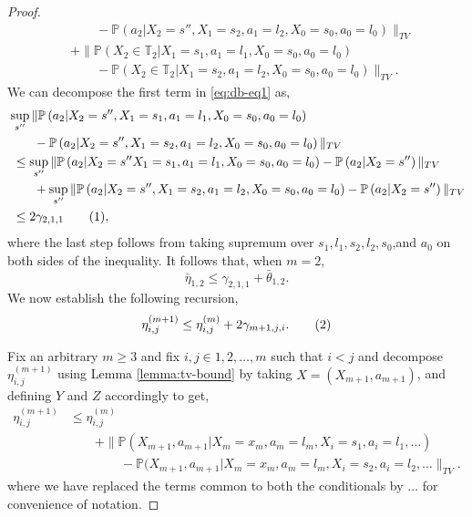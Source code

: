 \documentclass[10pt,a4paper]{amsart}
\newcommand{\Pbb}{\mathbb{P}}
\newcommand{\Tbb}{\mathbb{T}}
\newcommand{\lp}{\left(}
\newcommand\numberthis{\addtocounter{equation}{1}\tag{\theequation}}
\newcommand{\pow}[1]{^{(#1)}}
\newcommand{\prob}{\Pbb}
\newcommand{\probl}{\prob}
\newcommand{\rp}{\right)}
\begin{document}
\begin{proof}
\begin{align*}
    & \qquad -\probl\lp a_2|X_2=s'', X_1=s_2,a_1=l_2,X_0=s_0,a_0=l_0\rp\|_{TV}\\
    & + \|\probl\lp X_2\in \Tbb_2| X_1=s_1,a_1=l_1,X_0=s_0,a_0=l_0\rp\\
    & \qquad -\probl\lp X_2\in \Tbb_2| X_1=s_2,a_1=l_2,X_0=s_0,a_0=l_0\rp\|_{TV}.
\end{align*}
We can decompose the first term in \cref{eq:db-eq1} as,
\begin{align*}
    &\sup_{s''}\| \probl\lp a_2|X_2=s'', X_1=s_1,a_1=l_1,X_0=s_0,a_0=l_0\rp\\
    & \qquad -\probl\lp a_2|X_2=s'', X_1=s_2,a_1=l_2,X_0=s_0,a_0=l_0\rp\|_{TV}\\
    & \ \leq   \sup_{s''}\| \probl\lp a_2|X_2=s'' X_1=s_1,a_1=l_1,X_0=s_0,a_0=l_0\rp- \probl\lp a_2|X_2=s''\rp\|_{TV}\\
    & \qquad + \sup_{s''}\|\probl\lp a_2|X_2=s'', X_1=s_2,a_1=l_2,X_0=s_0,a_0=l_0\rp-\probl\lp a_2|X_2=s''\rp\|_{TV}\\
    & \ \leq 2\gamma_{2,1,1}\numberthis\label{eq:db-eq3},
\end{align*}
where the last step follows from taking supremum over $s_1,l_1,s_2,l_2,s_0$,and $a_0$ on both sides of the inequality. 
It follows that, when $m=2$,
\[
 \bar\eta_{1,2}\leq \gamma_{2,1,1}+\bar\theta_{1,2}.
\]
We now establish the following recursion,
\begin{align*}
 \eta_{i,j}^{(m+1)} \leq \eta_{i,j}^{(m)}+2\gamma_{m+1,j,i}.\numberthis\label{eq:db-eq5}    
\end{align*}

Fix an arbitrary $m\geq 3$ and fix $i,j\in{1,2,\dots,m}$ such that $i<j$ and
decompose $\eta_{i,j}\pow{m+1}$ using Lemma \ref{lemma:tv-bound} by taking $X=(X_{m+1},a_{m+1})$, and defining $Y$ and $Z$ accordingly to get,
\begin{align*}
    \eta_{i,j}^{(m+1)}& \leq \eta_{i,j}^{(m)}\\
    & \qquad + \|\probl(X_{m+1},a_{m+1}|X_{m}=x_{m},a_{m}=l_{m},X_i=s_1,a_i=l_1,\dots)\\
    & \qquad \qquad -\probl(X_{m+1},a_{m+1}|X_{m}=x_{m},a_{m}=l_{m},X_i=s_2,a_i=l_2,\dots\|_{TV}.
\end{align*}
where we have replaced the terms common to both the conditionals by $\dots$ for convenience of notation.


\end{proof}
\end{document}
